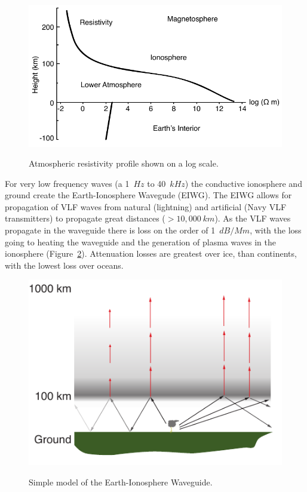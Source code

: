 
\begin{figure}[ht!]
	\centering
	\includegraphics[scale=1]{Introduction/Figures/Atmospheric_Conductivity.pdf}\\
	\caption{Atmospheric resistivity profile shown on a log scale.}
	\label{intro:fig:ionosphere}
\end{figure}

For very low frequency waves (a 1~$Hz$ to 40~$kHz$) the conductive ionosphere and ground create the Earth-Ionosphere Wavegude (EIWG).
The EIWG allows for propagation of VLF waves from natural (lightning) and artificial (Navy VLF transmitters) to propagate great distances ($>10,000~km$).
As the VLF waves propagate in the waveguide there is loss on the order of 1~$dB/Mm$, with the loss going to heating the waveguide and the generation of plasma waves in the ionosphere (Figure~\ref{intro:fig:eiwg}).
Attenuation losses are greatest over ice, than continents, with the lowest loss over oceans.

\begin{figure}[ht!]
	\centering
	\includegraphics[scale=1]{Introduction/Figures/EIWG.pdf}\\
	\caption{Simple model of the Earth-Ionosphere Waveguide.}
	\label{intro:fig:eiwg}
\end{figure}

